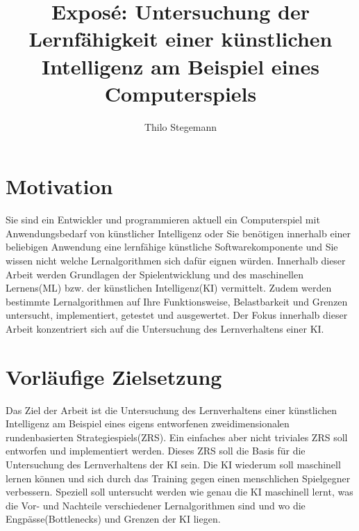 \documentclass[12pt,a4paper]{article}
\author{Thilo Stegemann}
\title{Exposé: Untersuchung der Lernfähigkeit einer künstlichen Intelligenz am Beispiel eines Computerspiels}
\begin{document}
\maketitle

\section*{Motivation}
Sie sind ein Entwickler und programmieren aktuell ein Computerspiel mit Anwendungsbedarf von künstlicher Intelligenz oder Sie benötigen innerhalb einer beliebigen Anwendung eine lernfähige künstliche Softwarekomponente und Sie wissen nicht welche Lernalgorithmen sich dafür eignen würden. Innerhalb dieser Arbeit werden Grundlagen der Spielentwicklung und des maschinellen Lernens(ML) bzw. der künstlichen Intelligenz(KI) vermittelt. Zudem werden bestimmte Lernalgorithmen auf Ihre Funktionsweise, Belastbarkeit und Grenzen untersucht, implementiert, getestet und ausgewertet. Der Fokus innerhalb dieser Arbeit konzentriert sich auf die Untersuchung des Lernverhaltens einer KI.

\section*{Vorläufige Zielsetzung}
Das Ziel der Arbeit ist die Untersuchung des Lernverhaltens einer künstlichen Intelligenz am Beispiel eines eigens entworfenen zweidimensionalen rundenbasierten Strategiespiels(ZRS). Ein einfaches aber nicht triviales ZRS soll entworfen und implementiert werden. Dieses ZRS soll die Basis für die Untersuchung des Lernverhaltens der KI sein. Die KI wiederum soll maschinell lernen können und sich durch das Training gegen einen menschlichen Spielgegner verbessern. Speziell soll untersucht werden wie genau die KI maschinell lernt, was die Vor- und Nachteile verschiedener Lernalgorithmen sind und wo die Engpässe(Bottlenecks) und Grenzen der KI liegen. 
\end{document}
